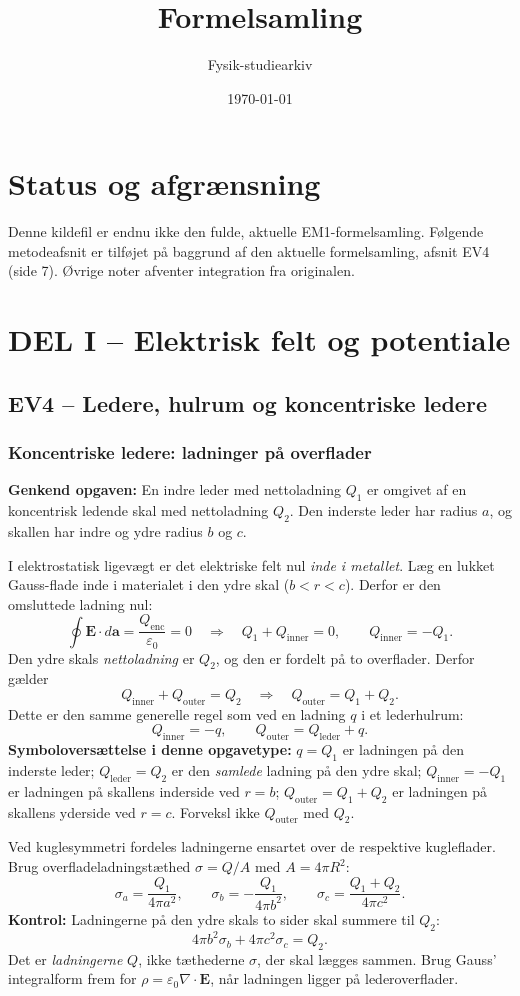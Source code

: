 \documentclass[11pt,a4paper,oneside]{book}
\begin{document}
\title{Formelsamling}
\author{Fysik-studiearkiv}\date{\today}\maketitle\tableofcontents
\chapter{Status og afgrænsning}
Denne kildefil er endnu ikke den fulde, aktuelle EM1-formelsamling. Følgende metodeafsnit er tilføjet på baggrund af den aktuelle formelsamling, afsnit EV4 (side 7). Øvrige noter afventer integration fra originalen.

\chapter{DEL I -- Elektrisk felt og potentiale}
\section{EV4 -- Ledere, hulrum og koncentriske ledere}
\subsection{Koncentriske ledere: ladninger på overflader}
\textbf{Genkend opgaven:} En indre leder med nettoladning $Q_1$ er omgivet af en koncentrisk ledende skal med nettoladning $Q_2$. Den inderste leder har radius $a$, og skallen har indre og ydre radius $b$ og $c$.

I elektrostatisk ligevægt er det elektriske felt nul \emph{inde i metallet}. Læg en lukket Gauss-flade inde i materialet i den ydre skal ($b<r<c$). Derfor er den omsluttede ladning nul:
\[
\oint \mathbf E\cdot d\mathbf a=\frac{Q_{\mathrm{enc}}}{\varepsilon_0}=0
\quad\Longrightarrow\quad
Q_1+Q_{\mathrm{inner}}=0,
\qquad Q_{\mathrm{inner}}=-Q_1.
\]
Den ydre skals \emph{nettoladning} er $Q_2$, og den er fordelt på to overflader. Derfor gælder
\[
Q_{\mathrm{inner}}+Q_{\mathrm{outer}}=Q_2
\quad\Longrightarrow\quad
\boxed{Q_{\mathrm{outer}}=Q_1+Q_2}.
\]
Dette er den samme generelle regel som ved en ladning $q$ i et lederhulrum:
\[
\boxed{Q_{\mathrm{inner}}=-q},
\qquad
\boxed{Q_{\mathrm{outer}}=Q_{\mathrm{leder}}+q}.
\]
\textbf{Symboloversættelse i denne opgavetype:}
$q=Q_1$ er ladningen på den inderste leder;
$Q_{\mathrm{leder}}=Q_2$ er den \emph{samlede} ladning på den ydre skal;
$Q_{\mathrm{inner}}=-Q_1$ er ladningen på skallens inderside ved $r=b$;
$Q_{\mathrm{outer}}=Q_1+Q_2$ er ladningen på skallens yderside ved $r=c$.
Forveksl ikke $Q_{\mathrm{outer}}$ med $Q_2$.

Ved kuglesymmetri fordeles ladningerne ensartet over de respektive kugleflader. Brug overfladeladningstæthed $\sigma=Q/A$ med $A=4\pi R^2$:
\[
\boxed{\sigma_a=\frac{Q_1}{4\pi a^2}},\qquad
\boxed{\sigma_b=-\frac{Q_1}{4\pi b^2}},\qquad
\boxed{\sigma_c=\frac{Q_1+Q_2}{4\pi c^2}}.
\]
\textbf{Kontrol:} Ladningerne på den ydre skals to sider skal summere til $Q_2$:
\[
4\pi b^2\sigma_b+4\pi c^2\sigma_c=Q_2.
\]
Det er \emph{ladningerne} $Q$, ikke tæthederne $\sigma$, der skal lægges sammen. Brug Gauss' integralform frem for $\rho=\varepsilon_0\nabla\cdot\mathbf E$, når ladningen ligger på lederoverflader.
\end{document}
